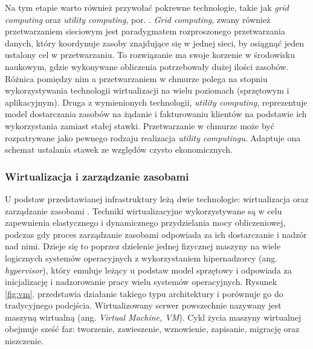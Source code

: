 \documentclass[12pt,a4paper,twoside]{article}
\begin{document}
Na tym etapie warto również przywołać pokrewne technologie, takie jak \textit{grid computing} oraz \textit{utility computing}, por. \citet{zhang2010}. \textit{Grid computing}, zwany również przetwarzaniem sieciowym jest paradygmatem rozproszonego przetwarzania danych, który koordynuje zasoby znajdujące się w jednej sieci, by osiągnąć jeden ustalony cel w przetwarzaniu. To rozwiązanie ma swoje korzenie w środowisku naukowym, gdzie wykonywane obliczenia potrzebowały dużej ilości zasobów. Różnica pomiędzy nim a przetwarzaniem w chmurze polega na stopniu wykorzystywania technologii wirtualizacji na wielu poziomach (sprzętowym i aplikacyjnym). Druga z wymienionych technologii, \textit{utility computing}, reprezentuje model dostarczania zasobów na żądanie i fakturowaniu klientów na podstawie ich wykorzystania zamiast stałej stawki. Przetwarzanie w chmurze może być rozpatrywane jako pewnego rodzaju realizacja \textit{utility computingu}. Adaptuje ona schemat ustalania stawek ze względów czysto ekonomicznych.

\subsubsection{Wirtualizacja i zarządzanie zasobami}

\noindent
U podstaw przedstawianej infrastruktury leżą dwie technologie: wirtualizacja oraz zarządzanie zasobami \citep{mustafa2015}. Techniki wirtualizacyjne wykorzystywane są w celu zapewnienia elastycznego i dynamicznego przydzielania mocy obliczeniowej, podczas gdy proces zarządzanie zasobami odpowiada za ich dostarczanie i nadzór nad nimi. Dzieje się to poprzez dzielenie jednej fizycznej maszyny na wiele logicznych systemów operacyjnych z wykorzystaniem hipernadzorcy (ang. \textit{hypervisor}), który emuluje leżący u podstaw model sprzętowy i odpowiada za inicjalizację i nadzorowanie pracy wielu systemów operacyjnych. Rysunek \ref{fig:vm}. przedstawia działanie takiego typu architektury i porównuje go do tradycyjnego podejścia. Wirtualizowany serwer powszechnie nazywany jest maszyną wirtualną (ang. \textit{Virtual Machine, VM}). Cykl życia maszyny wirtualnej obejmuje sześć faz: tworzenie, zawieszenie, wznowienie, zapisanie, migrację oraz niszczenie.
\end{document}
